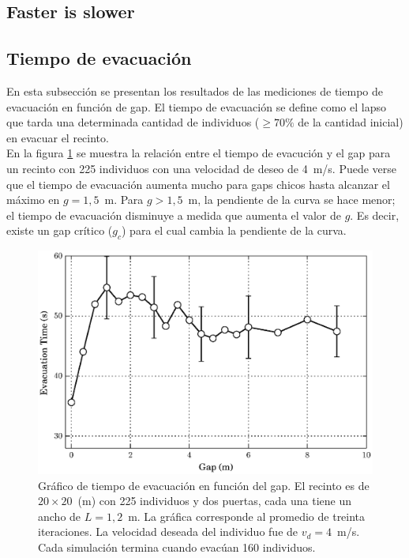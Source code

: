 \subsection{Faster is slower}


\subsection{Tiempo de evacuación}

En esta subsección se presentan los resultados de las mediciones de tiempo de evacuación en función de gap.
El tiempo de evacuación se define como el lapso que tarda una determinada cantidad de individuos ($\ge70\%$ de la cantidad inicial) en evacuar el recinto. \\

En la figura \ref{gap_vste_225_v4} se muestra la relación entre el tiempo de evacución y el gap para un recinto con 225 individuos con una velocidad de deseo de 4~m/s. Puede verse que el tiempo de evacuación aumenta mucho para gaps chicos hasta alcanzar el máximo en $g=1,5$~m. Para $g>1,5$~m, la pendiente de la curva se hace menor; el tiempo de evacuación disminuye a medida que aumenta el valor de $g$. 
Es decir, existe un gap crítico ($g_c$) para el cual cambia la pendiente de la curva.

\begin{figure}[H]
    \centering
    \includegraphics[scale=0.8]{figuras/gap_vste_225_v4_big.eps}
    \caption[width=5cm]{Gráfico de tiempo de evacuación en función del gap. El recinto es de $20\times 20$~(m) con 225 individuos y dos puertas, cada una tiene un ancho de $L=1,2$~m. La gráfica corresponde al promedio de treinta iteraciones. La velocidad deseada del individuo fue de $v_d=4$~m/s. Cada simulación termina cuando evacúan 160 individuos.}
    \label{gap_vste_225_v4}
\end{figure}

